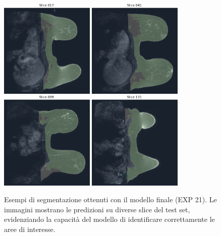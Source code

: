 \begin{figure}[H]
    \centering
    \includegraphics[width=0.40\textwidth]{figures/slice_017.png} 
    \includegraphics[width=0.40\textwidth]{figures/slice_041.png} 
    \includegraphics[width=0.40\textwidth]{figures/slice_089.png} 
    \includegraphics[width=0.40\textwidth]{figures/slice_131.png} 
    \caption{Esempi di segmentazione ottenuti con il modello finale (EXP 21). Le immagini mostrano le predizioni su diverse slice del test set, evidenziando la capacità del modello di identificare correttamente le aree di interesse.}
    \label{fig:final_segmentation_examples}
\end{figure}
